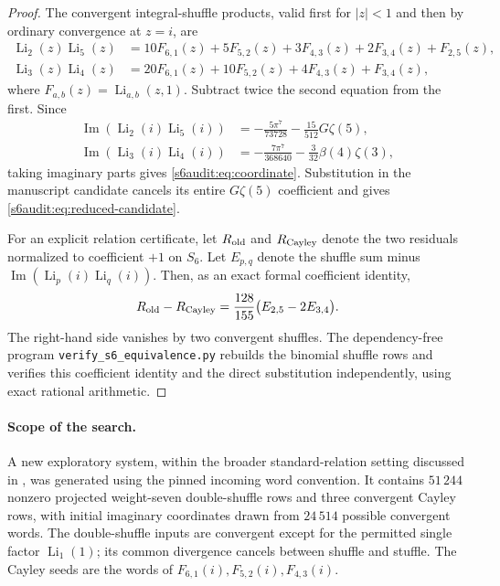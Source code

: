 \begin{proof}
The convergent integral-shuffle products, valid first for $|z|<1$ and
then by ordinary convergence at $z=i$, are
\begin{align*}
 \operatorname{Li}_2(z)\operatorname{Li}_5(z)
 &=10F_{6,1}(z)+5F_{5,2}(z)+3F_{4,3}(z)
   +2F_{3,4}(z)+F_{2,5}(z),\\
 \operatorname{Li}_3(z)\operatorname{Li}_4(z)
 &=20F_{6,1}(z)+10F_{5,2}(z)+4F_{4,3}(z)+F_{3,4}(z),
\end{align*}
where $F_{a,b}(z)=\operatorname{Li}_{a,b}(z,1)$.
Subtract twice the second equation from the first. Since
\begin{align*}
 \operatorname{Im}(\operatorname{Li}_2(i)\operatorname{Li}_5(i))
 &=-\frac{5\pi^7}{73728}-\frac{15}{512}G\zeta(5),\\
 \operatorname{Im}(\operatorname{Li}_3(i)\operatorname{Li}_4(i))
 &=-\frac{7\pi^7}{368640}-\frac3{32}\beta(4)\zeta(3),
\end{align*}
taking imaginary parts gives \eqref{s6audit:eq:coordinate}.
Substitution in the manuscript candidate cancels its entire
$G\zeta(5)$ coefficient and gives \eqref{s6audit:eq:reduced-candidate}.

For an explicit relation certificate, let $R_{\rm old}$ and
$R_{\rm Cayley}$ denote the two residuals normalized to coefficient
$+1$ on $S_6$. Let $E_{p,q}$ denote the shuffle sum minus
$\operatorname{Im}(\operatorname{Li}_p(i)\operatorname{Li}_q(i))$.
Then, as an exact formal coefficient identity,
\[
 R_{\rm old}-R_{\rm Cayley}
 =\frac{128}{155}\bigl(E_{2,5}-2E_{3,4}\bigr).
\]
The right-hand side vanishes by two convergent shuffles. The
dependency-free program \texttt{verify\_s6\_equivalence.py} rebuilds the
binomial shuffle rows and verifies this coefficient identity and the
direct substitution independently, using exact rational arithmetic.
\end{proof}

\paragraph{Scope of the search.}
A new exploratory system, within the broader standard-relation
setting discussed in \cite{cont:Zhao}, was generated using the pinned incoming
word convention. It contains $51\,244$ nonzero projected weight-seven
double-shuffle rows and three convergent Cayley rows, with initial
imaginary coordinates drawn from $24\,514$ possible convergent words.
The double-shuffle inputs are convergent except for the permitted single
factor $\operatorname{Li}_1(1)$; its common divergence cancels between
shuffle and stuffle. The Cayley seeds are the words of
$F_{6,1}(i),F_{5,2}(i),F_{4,3}(i)$.


